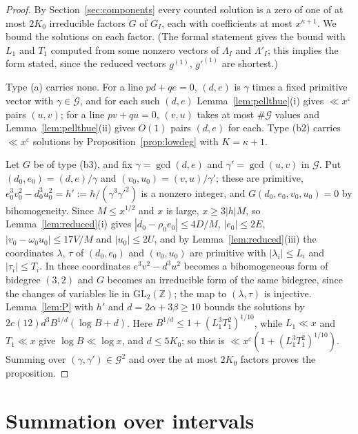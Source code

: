 \documentclass[11pt,reqno]{amsart}
\theoremstyle{definition}
\theoremstyle{remark}
\numberwithin{equation}{section}
\newcommand{\Z}{\mathbb Z}
\begin{document}
\begin{proof}
By Section~\ref{sec:components} every counted solution is a zero of one of at
most $2K_0$ irreducible factors $G$ of $G_I$, each with coefficients at most
$x^{\kappa+1}$. We bound the solutions on each factor. (The formal
statement gives the bound with $L_1$ and $T_1$ computed from some nonzero
vectors of $\Lambda_I$ and $\Lambda'_I$; this implies the form stated, since
the reduced vectors $g^{(1)}$, $g'^{(1)}$ are shortest.)

Type (a) carries none. For a line $pd+qe=0$, $(d,e)$ is $\gamma$ times a fixed
primitive vector with $\gamma\in\mathcal G$, and for each such $(d,e)$
Lemma~\ref{lem:pellthue}(i) gives $\ll x^\varepsilon$ pairs $(u,v)$; for a
line $pv+qu=0$, $(v,u)$ takes at most $\#\mathcal G$ values and
Lemma~\ref{lem:pellthue}(ii) gives $O(1)$ pairs $(d,e)$ for each. Type (b2)
carries $\ll x^\varepsilon$ solutions by Proposition~\ref{prop:lowdeg} with
$K=\kappa+1$.

Let $G$ be of type (b3), and fix $\gamma=\gcd(d,e)$ and
$\gamma'=\gcd(u,v)$ in $\mathcal G$. Put $(d_0,e_0)=(d,e)/\gamma$ and
$(v_0,u_0)=(v,u)/\gamma'$; these are primitive,
$e_0^3v_0^2-d_0^3u_0^2=h':=h/(\gamma^3\gamma'^2)$ is a nonzero integer, and
$G(d_0,e_0,v_0,u_0)=0$ by bihomogeneity. Since $M\le x^{1/2}$ and $x$ is
large, $x\ge3|h|M$, so Lemma~\ref{lem:reduced}(i) gives
$|d_0-\rho_0e_0|\le4D/M$, $|e_0|\le2E$, $|v_0-\omega_0u_0|\le17V/M$ and
$|u_0|\le2U$, and by Lemma~\ref{lem:reduced}(iii) the coordinates $\lambda$,
$\tau$ of $(d_0,e_0)$ and $(v_0,u_0)$ are primitive with $|\lambda_i|\le L_i$
and $|\tau_i|\le T_i$. In these coordinates $e^3v^2-d^3u^2$ becomes a
bihomogeneous form of bidegree $(3,2)$ and $G$ becomes an irreducible form of
the same bidegree, since the changes of variables lie in $\mathrm{GL}_2(\Z)$;
the map to $(\lambda,\tau)$ is injective. Lemma~\ref{lem:P} with $h'$ and
$d=2\alpha+3\beta\ge10$ bounds the solutions by
$2c(12)d^3B^{1/d}(\log B+d)$. Here $B^{1/d}\le1+(L_1^3T_1^2)^{1/10}$, while
$L_1\ll x$ and $T_1\ll x$ give $\log B\ll\log x$, and $d\le5K_0$; so this is
$\ll x^\varepsilon(1+(L_1^3T_1^2)^{1/10})$. Summing over
$(\gamma,\gamma')\in\mathcal G^2$ and over the at most $2K_0$ factors proves
the proposition.
\end{proof}

\section{Summation over intervals}\label{sec:sum}
\end{document}

